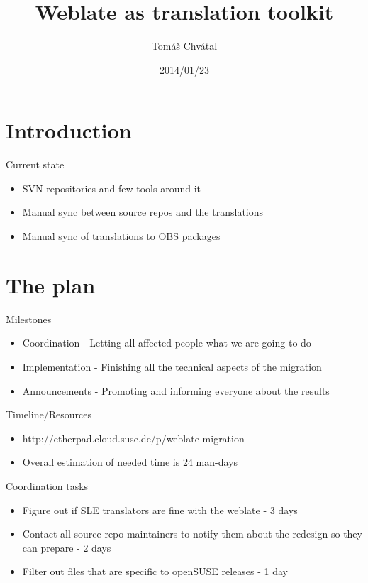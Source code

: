 \documentclass{beamer}
\author{Tom\'{a}\v{s} Chv\'{a}tal\newline {\small openSUSE Team}}
\title{Weblate as translation toolkit}
\date{2014/01/23}
\begin{document}
\begin{frame}[t,plain]
\titlepage
\end{frame}

\section{Introduction}

\begin{frame}[t]{Current state}
	\begin{itemize}
	\item SVN repositories and few tools around it
	\item Manual sync between source repos and the translations
	\item Manual sync of translations to OBS packages
	\end{itemize}
\end{frame}

\section{The plan}

\begin{frame}[t]{Milestones}
	\begin{itemize}
	\item Coordination - Letting all affected people what we are going to do
	\item Implementation - Finishing all the technical aspects of the migration
	\item Announcements - Promoting and informing everyone about the results
	\end{itemize}
\end{frame}

\begin{frame}[t]{Timeline/Resources}
	\begin{itemize}
	\item http://etherpad.cloud.suse.de/p/weblate-migration
	\item Overall estimation of needed time is 24 man-days
	\end{itemize}
\end{frame}

\begin{frame}[t]{Coordination tasks}
	\begin{itemize}
	\item Figure out if SLE translators are fine with the weblate - 3 days
	\item Contact all source repo maintainers to notify them about the redesign so they can prepare - 2 days
	\item Filter out files that are specific to openSUSE releases - 1 day
	\end{itemize}
\end{frame}
\end{document}
